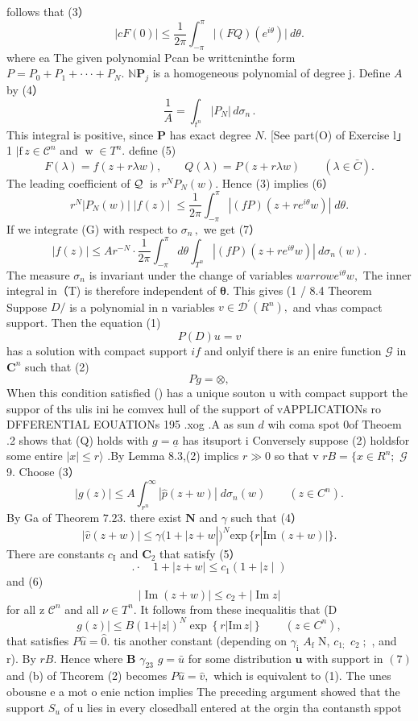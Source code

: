 follows that (3） $$ \vert c F(0)\vert\leq{\frac{1}{2\pi}}\int_{-\pi}^{\pi}\vert(F Q)(e^{i\theta})\vert\ d\theta. $$ where ea The given polynomial Pcan be writtcninthe form $P=P_{0}+P_{1}+\cdot\cdot\cdot+P_{N}.$ $\mathbb{N}\mathbf{P}_{j}$ is a homogeneous polynomial of degree j. Define $\textstyle A$ by (4） $$ \frac{1}{A}=\int_{t^{n}}\left|P_{N}\right|\,d\sigma_{n}\,. $$ This integral is positive, since ${\boldsymbol{P}}$ has exact degree $N.$ [See part(O) of Exercise l」 1 $|{\mathrm{f}}\,z\in{\mathcal{C}}^{n}$ and $\operatorname{w}\in T^{n}.$ define (5) $$ F(\lambda)=f(z+r\lambda w),\qquad Q(\lambda)=P(z+r\lambda w)\qquad(\lambda\in\bar{C}). $$ The leading coefficient of ${\cal Q}\,$ is $r^{N}P_{N}(w).$ Hence (3) implies (6） $$ r^{N}|P_{N}(w)|\;|f(z)|\;\leq\frac{1}{2\pi}\int_{-\pi}^{\pi}|(f P)(z+r e^{i\theta}w)|\;d\theta. $$ If we integrate (G) with respect to $\sigma_{n}\,,$ we get (7） $$ |f(z)|\le A r^{-N}\cdot\frac{1}{2\pi}\int_{-\pi}^{\pi}d\theta\int_{T^{n}}|(f P)(z+r e^{i\theta}w)|~d\sigma_{n}(w). $$ The measure $\sigma_{n}$ is invariant under the change of variables $w arrow e^{i\theta}w,$ The inner integral in（T) is therefore independent of ${\boldsymbol{\theta}}.$ This gives (1 / 8.4 Theorem Suppose $D\!\!\!\!/$ is a polynomial in n variables $v\in{\mathcal{D}}^{\prime}(R^{n}),$ and vhas compact support. Then the equation (1) $$ P(D)u=v $$ has a solution with compact support $i f$ and onlyif there is an enire function $\scriptstyle{\mathcal{G}}$ in ${\boldsymbol{C}}^{n}$ such that (2) $$ \scriptstyle P g=\otimes, $$ When this condition satisfied () has a unique souton u with compact support the suppor of ths ulis ini he comvex hull of the support of vAPPLICATIONs ro DFFERENTIAL EOUATIONs 195 .xog .A as sun $\boldsymbol{\mathit{d}}$ wih coma spot 0of Theoem .2 shows that (Q) holds with $\scriptstyle g={\underline{{a}}}$ has itsuport i Conversely suppose (2) holdsfor some entire $|x|\leq r\rangle$ .By Lemma 8.3,(2) implics $\scriptstyle r\gg0$ so that v $r B=\{x\in R^{n};$ $\mathcal{G}$ 9. Choose (3） $$ |g(z)|\le A\int_{r^{n}}^{\infty}|\hat{p}(z+w)|\;d\sigma_{n}(w)\qquad(z\in C^{n}). $$ By Ga of Theorem $\scriptstyle{7.23}.$ there exist ${\boldsymbol{N}}$ and $\gamma$ such that (4） $$ |\hat{v}(z+w)|\leq\gamma(1+\mid z+w|)^{N}\mathrm{exp}\,\{r|\mathrm{Im}\,(z+w)|\}. $$ There are constants $c_{\mathrm{I}}$ and ${\boldsymbol{C}}_{2}$ that satisfy (5） $$ .\cdot\quad1+\mid z+w\mid\leq c_{1}(1+\mid z\mid) $$ and (6) $$ |\operatorname{Im}\left(z+w\right)|\leq c_{2}+|\operatorname{Im}z| $$ for all z ${\mathcal{C}}^{n}$ and all $\nu\in T^{n}.$ It follows from these inequalitis that (D $$ g(z)|\leq B(1+\vert z\vert)^{N}\exp\left\{r\vert\mathrm{Im}\,z\vert\right\}\qquad(z\in C^{n}), $$ that satisfies $P{\hat{u}}={\hat{0}}.$ tis another constant (depending on $\gamma_{\mathrm{i}}$ $A_{\mathrm{f}}$ N, $c_{1;}$ $c_{\mathrm{2}}\;;$ , and r). By $r B.$ Hence where $\boldsymbol{B}$ $\gamma_{23}$ $g={\bar{u}}$ for some distribution ${\boldsymbol{u}}$ with support in $(7)$ and (b) of Thcorem (2) becomes $P{\hat{u}}={\hat{v}},$ which is equivalent to (1). The unes obousne e a mot o enie nction implies The preceding argument showed that the support $S_{u}$ of u lies in every closedball entered at the orgin tha contansth sppot 
